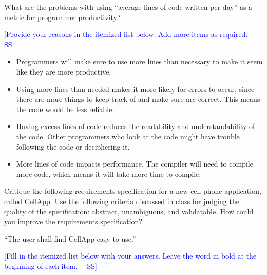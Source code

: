 \documentclass[12pt,fleqn]{examtst}
\newcommand{\authornote}[3]{\textcolor{#1}{[#3 ---#2]}}
\newcommand{\authornote}[3]{}
\newcommand{\wss}[1]{\authornote{blue}{SS}{#1}}
\begin{document}

\renewcommand{\labelenumi}{\Alph{enumi}.}

\newpage


 What are the problems with using ``average lines of code
written per day'' as a metric for programmer productivity?

\bigskip

\noindent \wss{Provide your reasons in the itemized list below.  Add more items
  as required.}

\begin{itemize}
\item Programmers will make sure to use more lines than necessary to make it seem like they are more productive.
\item Using more lines than needed makes it more likely for errors to occur, since there are more things to keep track of and make sure are correct. This means the code would be less reliable.
\item Having excess lines of code reduces the readability and understandability of the code. Other programmers who look at the code might have trouble following the code or deciphering it.
\item More lines of code impacts performance. The compiler will need to compile more code, which means it will take more time to compile.
\end{itemize}


\newpage

 Critique the following requirements specification
for a new cell phone application, called CellApp.  Use the following criteria
discussed in class for judging the quality of the specification: abstract,
unambiguous, and validatable.  How could you improve the requirements
specification?

\bigskip

``The user shall find CellApp easy to use.''

\bigskip

\noindent \wss{Fill in the itemized list below with your answers.  Leave the
  word in bold at the beginning of each item.}
\end{document}

